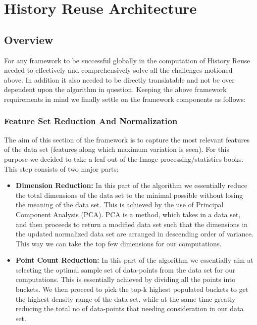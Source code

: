 \chapter{History Reuse Architecture}
\label{chap-four}

\section{Overview}
\label{overview}
For any framework to be successful globally in the computation of History Reuse needed to effectively and comprehensively solve all the challenges motioned above. In addition it also needed to be directly translatable and not be over dependent upon the algorithm in question. Keeping the above framework requirements in mind we finally settle on the framework components as follows:
\subsection{Feature Set Reduction And Normalization}
\label{fet_set_red}
The aim of this section of the framework is to capture the most relevant features of the data set (features along which maximum variation is seen). For this purpose we decided to take a leaf out of the Image processing/statistics books. This step consists of two major parts:
\begin{itemize}
    \item \textbf{Dimension Reduction:} In this part of the algorithm we essentially reduce the total dimensions of the data set to the minimal possible without losing the meaning of the data set. This is achieved by the use of Principal Component Analysis (PCA)\cite{pca}\cite{pca_visual}. PCA is a method, which takes in a data set, and then proceeds to return a modified data set such that the dimensions in the updated normalized data set are arranged in descending order of variance. This way we can take the top few dimensions for our computations.
    \item \textbf{Point Count Reduction:} In this part of the algorithm we essentially aim at selecting the optimal sample set of data-points from the data set for our computations. This is essentially achieved by dividing all the points into buckets. We then proceed to pick the top-k highest populated buckets to get the highest density range of the data set, while at the same time greatly reducing the total no of data-points that needing consideration in our data set.
\end{itemize}
